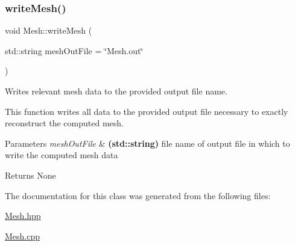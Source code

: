 \subsubsection{\texorpdfstring{write\+Mesh()}{writeMesh()}}
{\footnotesize\ttfamily void Mesh\+::write\+Mesh (\begin{DoxyParamCaption}\item[{std\+::string}]{mesh\+Out\+File = {\ttfamily \char`\"{}Mesh.out\char`\"{}} }\end{DoxyParamCaption})}



Writes relevant mesh data to the provided output file name. 

This function writes all data to the provided output file necessary to exactly reconstruct the computed mesh. 
\begin{DoxyParams}{Parameters}
{\em mesh\+Out\+File} & {\bfseries (std\+::string)} file name of output file in which to write the computed mesh data \\
\hline
\end{DoxyParams}
\begin{DoxyReturn}{Returns}
None 
\end{DoxyReturn}


The documentation for this class was generated from the following files\+:\begin{DoxyCompactItemize}
\item 
\mbox{\hyperlink{_mesh_8hpp}{Mesh.\+hpp}}\item 
\mbox{\hyperlink{_mesh_8cpp}{Mesh.\+cpp}}\end{DoxyCompactItemize}
